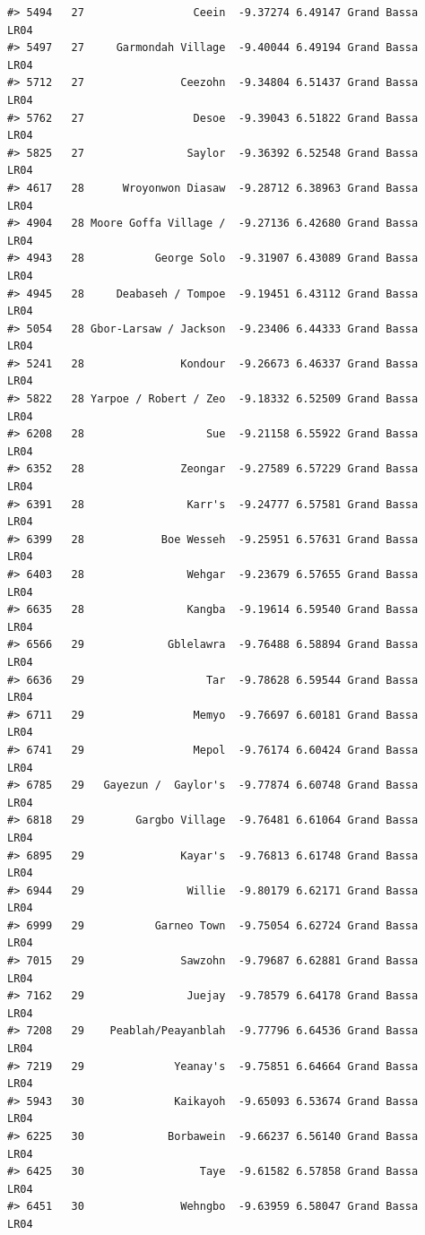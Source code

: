 \documentclass[12pt,a4paper]{book}
\theoremstyle{definition}
\theoremstyle{definition}
\theoremstyle{definition}
\theoremstyle{remark}
\begin{document}
\begin{verbatim}
#> 5494   27                 Ceein  -9.37274 6.49147 Grand Bassa       LR04
#> 5497   27     Garmondah Village  -9.40044 6.49194 Grand Bassa       LR04
#> 5712   27               Ceezohn  -9.34804 6.51437 Grand Bassa       LR04
#> 5762   27                 Desoe  -9.39043 6.51822 Grand Bassa       LR04
#> 5825   27                Saylor  -9.36392 6.52548 Grand Bassa       LR04
#> 4617   28      Wroyonwon Diasaw  -9.28712 6.38963 Grand Bassa       LR04
#> 4904   28 Moore Goffa Village /  -9.27136 6.42680 Grand Bassa       LR04
#> 4943   28           George Solo  -9.31907 6.43089 Grand Bassa       LR04
#> 4945   28     Deabaseh / Tompoe  -9.19451 6.43112 Grand Bassa       LR04
#> 5054   28 Gbor-Larsaw / Jackson  -9.23406 6.44333 Grand Bassa       LR04
#> 5241   28               Kondour  -9.26673 6.46337 Grand Bassa       LR04
#> 5822   28 Yarpoe / Robert / Zeo  -9.18332 6.52509 Grand Bassa       LR04
#> 6208   28                   Sue  -9.21158 6.55922 Grand Bassa       LR04
#> 6352   28               Zeongar  -9.27589 6.57229 Grand Bassa       LR04
#> 6391   28                Karr's  -9.24777 6.57581 Grand Bassa       LR04
#> 6399   28            Boe Wesseh  -9.25951 6.57631 Grand Bassa       LR04
#> 6403   28                Wehgar  -9.23679 6.57655 Grand Bassa       LR04
#> 6635   28                Kangba  -9.19614 6.59540 Grand Bassa       LR04
#> 6566   29             Gblelawra  -9.76488 6.58894 Grand Bassa       LR04
#> 6636   29                   Tar  -9.78628 6.59544 Grand Bassa       LR04
#> 6711   29                 Memyo  -9.76697 6.60181 Grand Bassa       LR04
#> 6741   29                 Mepol  -9.76174 6.60424 Grand Bassa       LR04
#> 6785   29   Gayezun /  Gaylor's  -9.77874 6.60748 Grand Bassa       LR04
#> 6818   29        Gargbo Village  -9.76481 6.61064 Grand Bassa       LR04
#> 6895   29               Kayar's  -9.76813 6.61748 Grand Bassa       LR04
#> 6944   29                Willie  -9.80179 6.62171 Grand Bassa       LR04
#> 6999   29           Garneo Town  -9.75054 6.62724 Grand Bassa       LR04
#> 7015   29               Sawzohn  -9.79687 6.62881 Grand Bassa       LR04
#> 7162   29                Juejay  -9.78579 6.64178 Grand Bassa       LR04
#> 7208   29    Peablah/Peayanblah  -9.77796 6.64536 Grand Bassa       LR04
#> 7219   29              Yeanay's  -9.75851 6.64664 Grand Bassa       LR04
#> 5943   30              Kaikayoh  -9.65093 6.53674 Grand Bassa       LR04
#> 6225   30             Borbawein  -9.66237 6.56140 Grand Bassa       LR04
#> 6425   30                  Taye  -9.61582 6.57858 Grand Bassa       LR04
#> 6451   30               Wehngbo  -9.63959 6.58047 Grand Bassa       LR04

\end{verbatim}
\end{document}
